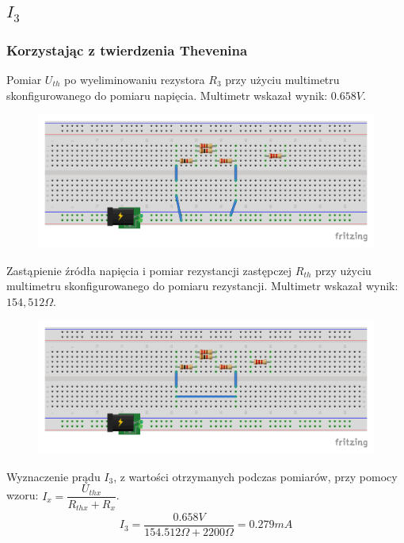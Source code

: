 \documentclass[polish,polish,a4paper]{article}
\begin{document}
\begin{spacing}{2}
	\subsection{$I_{3}$}
		\subsubsection{Korzystając z twierdzenia Thevenina}
					Pomiar $U_{th}$ po wyeliminowaniu rezystora $R_{3}$ przy  użyciu multimetru skonfigurowanego do pomiaru napięcia. Multimetr wskazał wynik: $0.658V$.
		\begin{figure}[H]
			\centering
			\includegraphics[scale=0.8]{R3_pomiar_napiecia_bb.pdf}
		\end{figure}
		
		Zastąpienie źródła napięcia i pomiar rezystancji zastępczej $R_{th}$ przy użyciu multimetru skonfigurowanego do pomiaru rezystancji. Multimetr wskazał wynik: $ 154,512\Omega $.
		\begin{figure}[H]
			\centering
			\includegraphics[scale=0.8]{R3_pomiar_oporu_bb.pdf}
		\end{figure}
		Wyznaczenie prądu $I_{3}$, z wartości otrzymanych podczas pomiarów, przy pomocy wzoru: $I_{x}= \dfrac{U_{thx}}{R_{thx} + R_{x}}$.
		\begin{gather*}
		I_{3}=\dfrac{0.658V}{154.512\Omega + 2200\Omega } = 0.279mA
		\end{gather*}

\end{spacing}
\end{document}
